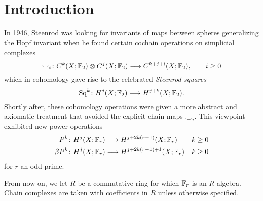 
\section{Introduction} \label{s:introduction}

In 1946, Steenrod was looking for invariants of maps between spheres generalizing the Hopf invariant when he found certain cochain operations on simplicial complexes
\[\smile_i\colon C^k(X;\mathbb{F}_2)\otimes C^j(X;\mathbb{F}_2)\longrightarrow C^{k+j+i}(X;\mathbb{F}_2),\qquad i\geq 0\]
which in cohomology gave rise to the celebrated \emph{Steenrod squares}
\[\operatorname{Sq}^{k}\colon H^j(X;\mathbb{F}_2)\longrightarrow H^{j+k}(X;\mathbb{F}_2).\]
Shortly after, these cohomology operations were given a more abstract and axiomatic treatment that avoided the explicit chain maps $\smile_i$. This viewpoint exhibited new power operations
\begin{align*}
	P^{k}\colon H^j(X;\mathbb{F}_r)&\longrightarrow H^{j+2k(r-1)}(X;\mathbb{F}_r) & k\geq 0 \\
	\beta P^k\colon H^j(X;\mathbb{F}_r)&\longrightarrow H^{j+2k(r-1)+1}(X;\mathbb{F}_r) & k\geq 0
\end{align*}
for $r$ an odd prime.

From now on, we let $R$ be a commutative ring for which $\mathbb{F}_r$ is an $R$-algebra. Chain complexes are taken with coefficients in $R$ unless otherwise specified.


